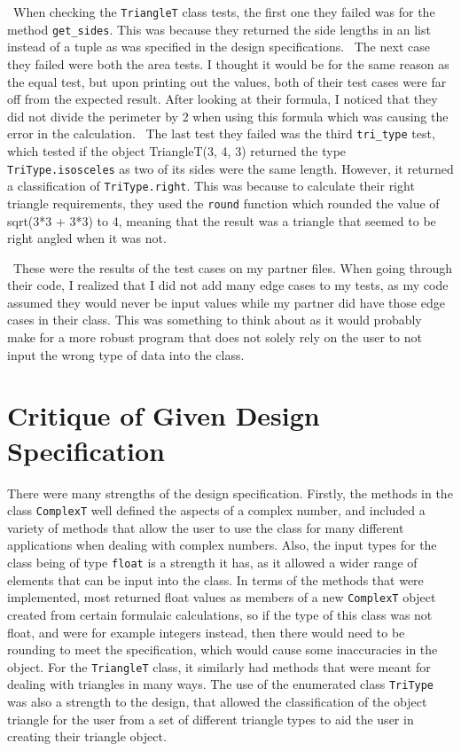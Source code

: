 \documentclass[12pt]{article}
\begin{document}
~\newline\noindent When checking the \verb|TriangleT| class tests, the first one they failed was for the method \verb|get_sides|. This was because they returned the side lengths in an list instead of a tuple as was specified in the design specifications.
~\newline\noindent The next case they failed were both the area tests. I thought it would be for the same reason as the equal test, but upon printing out the values, both of their test cases were far off from the expected result. After looking at their formula, I noticed that they did not divide the perimeter by 2 when using this formula which was causing the error in the calculation. 
~\newline\noindent The last test they failed was the third \verb|tri_type| test, which tested if the object TriangleT(3, 4, 3) returned the type \verb|TriType.isosceles| as two of its sides were the same length. However, it returned a classification of \verb|TriType.right|. This was because to calculate their right triangle requirements, they used the \verb|round| function which rounded the value of sqrt(3*3 + 3*3) to 4, meaning that the result was a triangle that seemed to be right angled when it was not. 

~\newline\noindent These were the results of the test cases on my partner files. When going through their code, I realized that I did not add many edge cases to my tests, as my code assumed they would never be input values while my partner did have those edge cases in their class. This was something to think about as it would probably make for a more robust program that does not solely rely on the user to not input the wrong type of data into the class. 

\section{Critique of Given Design Specification}

There were many strengths of the design specification. Firstly, the methods in the class \verb|ComplexT| well defined the aspects of a complex number, and included a variety of methods that allow the user to use the class for many different applications when dealing with complex numbers. Also, the input types for the class being of type \verb|float| is a strength it has, as it allowed a wider range of elements that can be input into the class. In terms of the methods that were implemented, most returned float values as members of a new \verb|ComplexT| object created from certain formulaic calculations, so if the type of this class was not float, and were for example integers instead, then there would need to be rounding to meet the specification, which would cause some inaccuracies in the object. For the \verb|TriangleT| class, it similarly had methods that were meant for dealing with triangles in many ways. The use of the enumerated class \verb|TriType| was also a strength to the design, that allowed the classification of the object triangle for the user from a set of different triangle types to aid the user in creating their triangle object. 
\end{document}
